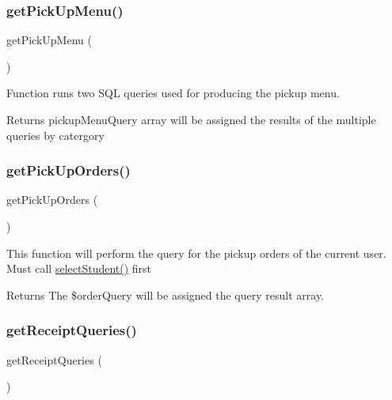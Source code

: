 \subsubsection{\texorpdfstring{getPickUpMenu()}{getPickUpMenu()}}
{\footnotesize\ttfamily get\+Pick\+Up\+Menu (\begin{DoxyParamCaption}{ }\end{DoxyParamCaption})}

Function runs two S\+QL queries used for producing the pickup menu. \begin{DoxyReturn}{Returns}
pickup\+Menu\+Query array will be assigned the results of the multiple queries by catergory 
\end{DoxyReturn}
\mbox{\label{_pickup___order___selection_8class_8php_a610ed5203a0a81eb865c12a6ce45f5b8}} 
\subsubsection{\texorpdfstring{getPickUpOrders()}{getPickUpOrders()}}
{\footnotesize\ttfamily get\+Pick\+Up\+Orders (\begin{DoxyParamCaption}{ }\end{DoxyParamCaption})}

This function will perform the query for the pickup orders of the current user. Must call \mbox{\hyperlink{_pickup___order___selection_8class_8php_aa3d29d516196eed16f5553dd20b8011e}{select\+Student()}} first \begin{DoxyReturn}{Returns}
The \$order\+Query will be assigned the query result array. 
\end{DoxyReturn}
\mbox{\label{_pickup___order___selection_8class_8php_afea91457e1886d995f1a6de7439ceaeb}} 
\subsubsection{\texorpdfstring{getReceiptQueries()}{getReceiptQueries()}}
{\footnotesize\ttfamily get\+Receipt\+Queries (\begin{DoxyParamCaption}{ }\end{DoxyParamCaption})}

